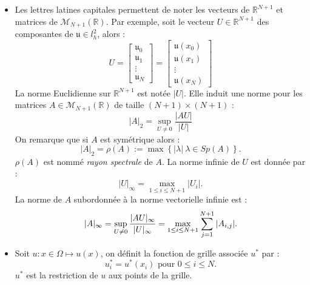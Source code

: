 \begin{itemize}
\item Les lettres latines capitales permettent de noter les vecteurs de $\mathbb{R}^{N+1}$ et matrices de $\mathcal{M}_{N+1}(\mathbb{R})$. Par exemple, soit le vecteur $U \in \mathbb{R}^{N+1}$ des composantes de $\mathfrak{u} \in l^2_h$, alors :
\begin{equation}
U = \begin{bmatrix}
\mathfrak{u}_0 \\ \mathfrak{u}_1 \\ \vdots \\ \mathfrak{u}_N
\end{bmatrix} =
\begin{bmatrix}
\mathfrak{u}(x_0) \\ \mathfrak{u}(x_1) \\ \vdots \\ \mathfrak{u}(x_N)
\end{bmatrix}
\end{equation}
La norme Euclidienne sur $\mathbb{R}^{N+1}$ est notée $|U|$. Elle induit une norme pour les matrices $A \in \mathcal{M}_{N+1}(\mathbb{R})$ de taille $(N+1) \times (N+1)$ :
\begin{equation}
|A|_2 = \sup_{U \neq 0} \dfrac{|AU|}{|U|}
\end{equation}
On remarque que si $A$ est symétrique alors :
\begin{equation}
|A|_2 = \rho(A) := \max \left\lbrace |\lambda| \ \lambda \in Sp(A) \right\rbrace.
\end{equation}
$\rho(A)$ est nommé \textit{rayon spectrale} de $A$.
La norme infinie de $U$ est donnée par :
\begin{equation}
|U|_{\infty} = \max_{1 \leq i \leq N+1} |U_i|.
\end{equation}
La norme de $A$ subordonnée à la norme vectorielle infinie est :
\begin{equation}
|A|_{\infty} = \sup_{U \neq 0} \dfrac{|AU|_{\infty}}{|U|_{\infty}} = \max_{1 \leq i \leq N+1} \displaystyle\sum\limits_{j=1}^{N+1} |A_{i,j}|.
\end{equation}

\item Soit $u: x \in \Omega \mapsto u(x)$, on définit la fonction de grille associée $u^*$ par :
\begin{equation}
u^*_i = u^*(x_i) \text{ pour } 0 \leq i \leq N.
\end{equation}
$u^*$ est la restriction de $u$ aux points de la grille.
\end{itemize}

